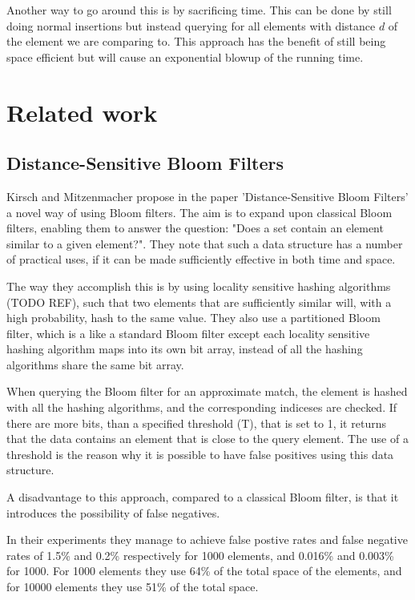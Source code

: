 \documentclass[a4paper,11pt]{article}
\begin{document}
Another way to go around this is by sacrificing time. This can be done by still doing normal insertions but instead querying for all elements with distance $d$ of the element we are comparing to. This approach has the benefit of still being space efficient but will cause an exponential blowup of the running time.





\section{Related work} %

\subsection{Distance-Sensitive Bloom Filters}
Kirsch and Mitzenmacher propose in the paper 'Distance-Sensitive Bloom Filters'\cite{paper:harvard} a novel way of using Bloom filters. The aim is to expand upon classical Bloom filters, enabling them to answer the question: "Does a set contain an element similar to a given element?". They note that such a data structure has a number of practical uses, if it can be made sufficiently effective in both time and space.

The way they accomplish this is by using locality sensitive hashing algorithms (TODO REF), such that two elements that are sufficiently similar will, with a high probability, hash to the same value. They also use a partitioned Bloom filter, which is a like a standard Bloom filter except each locality sensitive hashing algorithm maps into its own bit array, instead of all the hashing algorithms share the same bit array.

When querying the Bloom filter for an approximate match, the element is hashed with all the hashing algorithms, and the corresponding indiceses are checked. If there are more bits, than a specified threshold (T), that is set to 1, it returns that the data contains an element that is close to the query element. The use of a threshold is the reason why it is possible to have false positives using this data structure.

A disadvantage to this approach, compared to a classical Bloom filter, is that it introduces the possibility of false negatives.

In their experiments they manage to achieve false postive rates and false negative rates of 1.5\% and 0.2\% respectively for 1000 elements, and 0.016\% and 0.003\% for 1000. For 1000 elements they use 64\% of the total space of the elements, and for 10000 elements they use 51\% of the total space.
\end{document}
